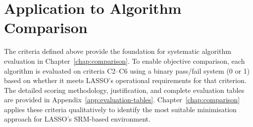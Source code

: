 \section{Application to Algorithm Comparison}

The criteria defined above provide the foundation for systematic algorithm evaluation in Chapter~\ref{chap:comparison}. To enable objective comparison, each algorithm is evaluated on criteria C2--C6 using a binary pass/fail system (0 or 1) based on whether it meets LASSO's operational requirements for that criterion. The detailed scoring methodology, justification, and complete evaluation tables are provided in Appendix~\ref{app:evaluation-tables}. Chapter~\ref{chap:comparison} applies these criteria qualitatively to identify the most suitable minimisation approach for LASSO's SRM-based environment.


